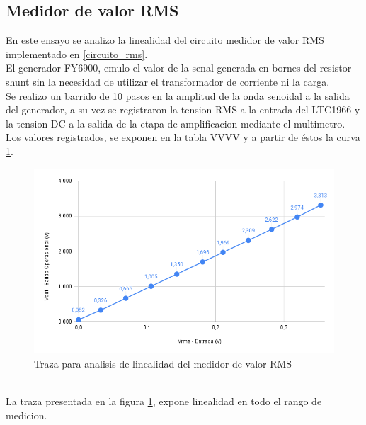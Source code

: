 \subsection{Medidor de valor RMS}\label{ensayo_medidor_rms}
En este ensayo se analizo la linealidad del circuito medidor de valor RMS implementado en \ref{circuito_rms}.\\
El generador FY6900, emulo el valor de la senal generada en bornes del resistor shunt sin la necesidad de utilizar el transformador de corriente ni la carga.\\
Se realizo un barrido de 10 pasos en la amplitud de la onda senoidal a la salida del generador, a su vez se registraron la tension RMS a la entrada del LTC1966 y la tension DC a la salida de la etapa de amplificacion mediante el multimetro. Los valores registrados, se exponen en la tabla VVVV y a partir de \'{e}stos la curva \ref{fig:ensayoinealidadmedidorrms}.\\
\begin{figure}[h]
	\centering
	\includegraphics[width=1.0\linewidth]{Figures/ensayo_inealidad_medidor_RMS}
	\caption{Traza para analisis de linealidad del medidor de valor RMS}
	\label{fig:ensayoinealidadmedidorrms}
\end{figure}\\
La traza presentada en la figura \ref{fig:ensayoinealidadmedidorrms}, expone linealidad en todo el rango de medicion. 

